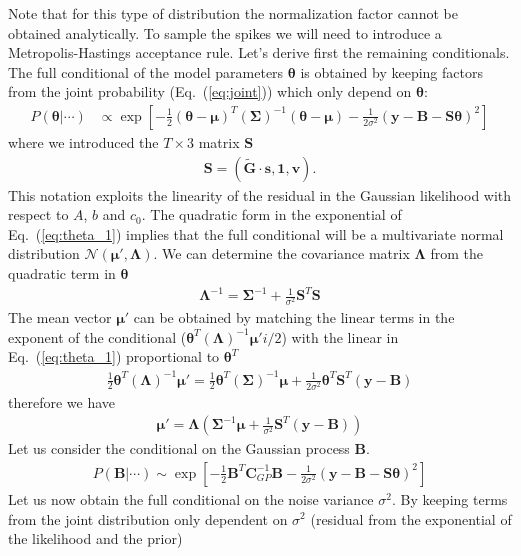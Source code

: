 \documentclass{article}
\theoremstyle{remark}
\begin{document}
Note that for this type of distribution the normalization factor cannot be obtained analytically. To sample the spikes we will need to introduce a Metropolis-Hastings acceptance rule. Let's derive first the remaining conditionals. The full conditional of the model parameters $\bm{\theta}$ is obtained by keeping factors from the joint probability (Eq.~(\ref{eq:joint})) which only depend on $\bm{\theta}$:
\begin{align}
    P(\bm{\theta} | \cdots) &\propto \exp\left[-\frac{1}{2} (\bm{\theta}-\bm{\mu})^T(\bm\Sigma)^{-1}(\bm\theta-\bm\mu)-\frac{1}{2\sigma^2}(\bm y-\bm B -\bm S \bm\theta)^2\right] \label{eq:theta_1}
\end{align}
where we introduced the $T\times3$ matrix $\bm S$ 
\begin{align}
    \bm S = (\bm{\tilde G}\cdot\bm{s},\bm{1},\bm v).
\end{align}
This notation exploits the linearity of the residual in the Gaussian likelihood with respect to $A$, $b$ and $c_0$.
The quadratic form in the exponential of Eq.~(\ref{eq:theta_1}) implies that the full conditional will be a multivariate normal distribution $\mathcal{N}(\bm\mu',\bm\Lambda)$. We can determine the covariance matrix $\bm\Lambda$ from the quadratic term in $\bm\theta$
\begin{align}
    \bm{\Lambda}^{-1} = \bm{\Sigma}^{-1}+\frac{1}{\sigma^2}\bm{S}^T \bm{S}
\end{align}
The mean vector $\bm\mu'$ can be obtained by matching the linear terms in the exponent of the conditional ($\bm\theta^T(\bm\Lambda)^{-1}\bm\mu'i/2$) with the linear in Eq.~(\ref{eq:theta_1}) proportional to $\bm\theta^T$
\begin{align}
    \frac{1}{2}\bm\theta^T(\bm\Lambda)^{-1}\bm\mu' = \frac{1}{2}\bm\theta^T(\bm\Sigma)^{-1}\bm\mu+\frac{1}{2\sigma^2}\bm{\theta}^T\bm{S}^T(\bm{y}-\bm{B})
\end{align}
therefore we have
\begin{align}
    \bm\mu'=\bm\Lambda\left(\bm\Sigma^{-1}\bm\mu+\frac{1}{\sigma^2}\bm{S}^T(\bm{y}-\bm{B})\right)
\end{align}
Let us consider the conditional on the Gaussian process $\bm B$. 
\begin{align}
    P(\bm B| \cdots) \sim \exp \left[ -\frac{1}{2} \bm B^T \bm{C}^{-1}_{GP} \bm{B}-\frac{1}{2\sigma^2}(\bm y-\bm B-\bm{S\theta})^2\right]
\end{align}
Let us now obtain the full conditional on the noise variance $\sigma^2$. By keeping terms from the joint distribution only dependent on $\sigma^2$ (residual from the exponential of the likelihood and the prior)
\end{document}
